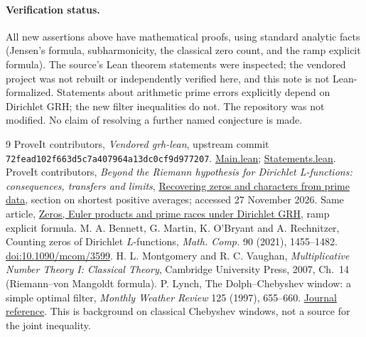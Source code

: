 \documentclass[11pt]{article}
\theoremstyle{remark}\newtheorem{remark}[theorem]{Remark}
\newcommand{\repo}{https://github.com/VladimirReshetnikov/ProveIt/blob/main/Analysis/GeneralizedRiemannHypothesis/}
\begin{document}
\paragraph{Verification status.} All new assertions above have mathematical proofs, using standard analytic facts (Jensen's formula, subharmonicity, the classical zero count, and the ramp explicit formula). The source's Lean theorem statements were inspected; the vendored project was not rebuilt or independently verified here, and this note is not Lean-formalized. Statements about arithmetic prime errors explicitly depend on Dirichlet GRH; the new filter inequalities do not. The repository was not modified. No claim of resolving a further named conjecture is made.
\begin{thebibliography}{9}
 ProveIt contributors, \emph{Vendored grh-lean}, upstream commit \texttt{72fead102f663d5c7a407964a13dc0cf9d977207}. \href{\repo vendor/grh-lean/grh/src/Main.lean}{Main.lean}; \href{\repo vendor/grh-lean/grh/src/Statements.lean}{Statements.lean}.
 ProveIt contributors, \emph{Beyond the Riemann hypothesis for Dirichlet L-functions: consequences, transfers and limits}, \href{\repo Article/sections/rec.tex}{Recovering zeros and characters from prime data}, section on shortest positive averages; accessed 27 November 2026.
 Same article, \href{\repo Article/sections/zer.tex}{Zeros, Euler products and prime races under Dirichlet GRH}, ramp explicit formula.
 M. A. Bennett, G. Martin, K. O'Bryant and A. Rechnitzer, Counting zeros of Dirichlet $L$-functions, \emph{Math. Comp.} 90 (2021), 1455--1482. \href{https://doi.org/10.1090/mcom/3599}{doi:10.1090/mcom/3599}.
 H. L. Montgomery and R. C. Vaughan, \emph{Multiplicative Number Theory I: Classical Theory}, Cambridge University Press, 2007, Ch.~14 (Riemann--von Mangoldt formula).
 P. Lynch, The Dolph--Chebyshev window: a simple optimal filter, \emph{Monthly Weather Review} 125 (1997), 655--660. \href{https://journals.ametsoc.org/doi/10.1175/1520-0493(1997)125\%3C0655\%3ATDCWAS\%3E2.0.CO\%3B2}{Journal reference}. This is background on classical Chebyshev windows, not a source for the joint inequality.
\end{thebibliography}
\end{document}
